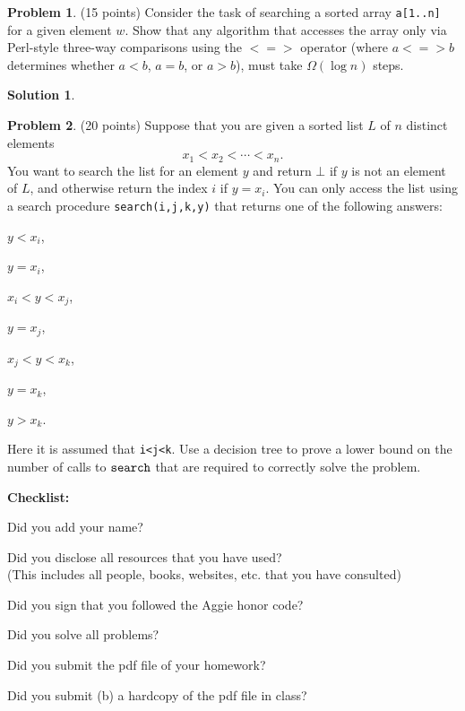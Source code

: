\documentclass{article}
\theoremstyle{definition}
\newtheorem{problem}{Problem}
\newtheorem*{solution}{Solution}
\newcommand{\checklist}{\noindent\textbf{Checklist:}
\begin{compactitem}[$\Box$] 
\item Did you add your name? 
\item Did you disclose all resources that you have used? \\
(This includes all people, books, websites, etc. that you have consulted)
\item Did you sign that you followed the Aggie honor code? 
\item Did you solve all problems? 
\item Did you submit the pdf file of your homework?
\item Did you submit (b) a hardcopy of the pdf file in class? 
\end{compactitem}
}
\begin{document}
\begin{problem} (15 points) Consider the task of searching a sorted
  array \verb|a[1..n]| for a given element $w$. Show that any
  algorithm that accesses the array only via Perl-style three-way
  comparisons using the $<=>$ operator (where $a <=> b$ determines
  whether $a<b$, $a=b$, or $a>b$), must take $\Omega(\log n)$ steps.
\end{problem}
\begin{solution}
\end{solution}

\begin{problem}(20 points)
 Suppose that you are given a sorted list $L$ of $n$ distinct
elements
$$ x_1 < x_2 < \cdots < x_n.$$ 
You want to search the list for an element $y$ and return $\bot$ if
$y$ is not an element of $L$, and otherwise return the index $i$ if
$y=x_i$. You can only access the list using a search procedure 
\verb|search(i,j,k,y)| that returns one of the following answers: 
\begin{inparaenum}[(i)]
\item $y<x_i$,
\item $y=x_i$,
\item $x_i<y<x_j$,
\item $y=x_j$,
\item $x_j<y<x_k$,
\item $y=x_k$,
\item $y>x_k$.
\end{inparaenum}
Here it is assumed that \verb|i<j<k|. 
Use a decision tree to prove a lower bound on the number of calls to
$\verb|search|$ that are required to correctly solve the problem. 


\end{problem}










\medskip



\goodbreak
\checklist
\end{document}
